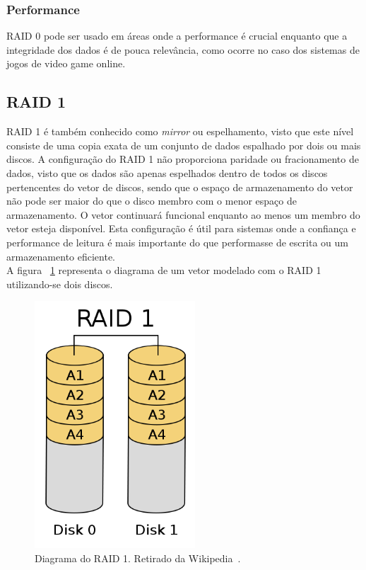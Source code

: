 		\subsubsection{Performance}
		
		RAID 0 pode ser usado em áreas onde a performance é crucial enquanto que a integridade dos dados é de pouca relevância, como ocorre no caso dos sistemas de jogos de video game online.\\
		
		\subsection{RAID 1}
		
		RAID 1 é também conhecido como \textit{mirror} ou espelhamento, visto que este nível consiste de uma copia exata de um conjunto de dados espalhado por dois ou mais discos. A configuração do RAID 1 não proporciona paridade ou fracionamento de dados, visto que os dados são apenas espelhados dentro de todos os discos pertencentes do vetor de discos, sendo que o espaço de armazenamento do vetor não pode ser maior do que o disco membro com o menor espaço de armazenamento. O vetor continuará funcional enquanto ao menos um membro do vetor esteja disponível. Esta configuração é útil para sistemas onde a confiança e performance de leitura é mais importante do que performasse de escrita ou um armazenamento eficiente. \\
		
		A figura ~\ref{fig:raid1} representa o diagrama de um vetor modelado com o RAID 1 utilizando-se dois discos.\\
		
		\begin{figure}[htb]
			\begin{center}
				
				\includegraphics[clip,width=6.0cm]{images/RAID_1.png}
				\caption{Diagrama do RAID 1. Retirado da Wikipedia~\citep{wikiRAIDlevels}.}
				\label{fig:raid1}
			\end{center}
		\end{figure} 
		
